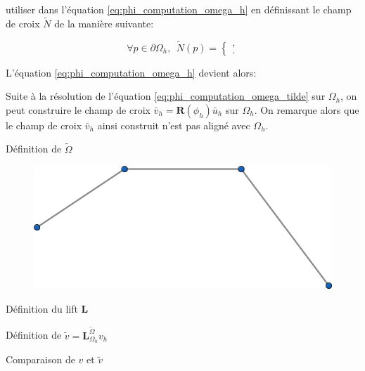 utiliser dans l'équation \eqref{eq:phi_computation_omega_h} en définissant le champ de croix $\widetilde{N}$ de la manière suivante:

$$
\forall p\in\partial\Omega_h,~~\widetilde{N}(p)=
\left\{
\begin{array}{lcl}
,\\[0.25cm]
.
\end{array}
\right.
$$

L'équation \eqref{eq:phi_computation_omega_h} devient alors:


Suite à la résolution de l'équation \eqref{eq:phi_computation_omega_tilde} sur $\Omega_h$, on peut construire le champ de croix $\bar{v}_h=\mathbf{R}(\phi_h)\bar{u}_h$ sur $\Omega_h$. On remarque alors que le champ de croix $\bar{v}_h$ ainsi construit n'est pas aligné avec $\Omega_h$.

\[\]
Définition de $\widetilde{\Omega}$

\begin{figure}[!h]
\centering
\includegraphics[scale=0.65]{images/Omega_h_tilde.png}
\caption{}
\label{fig:omega_h_tilde}
\end{figure}

\[\]
Définition du lift $\mathbf{L}$

\[\]
Définition de $\widetilde{v}=\mathbf{L}_{\Omega_h}^{\widetilde{\Omega}}v_h$

\[\]
Comparaison de $v$ et $\widetilde{v}$

